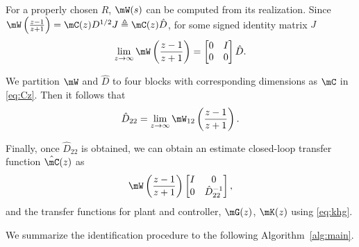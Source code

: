   For a properly chosen $R$, $\mW(s)$ can be computed from its realization. Since $\mW\left(\frac{z-1}{z+1}\right)=\mC(z)D^{1/2}J\triangleq \mC(z)\hat{D}$, for some signed identity matrix $J$ \cite{hayden}
  \begin{equation}
    \lim_{z\rightarrow\infty}\mW\left(\frac{z-1}{z+1}\right)=\begin{bmatrix} 0 & I \\
      0 & 0 
    \end{bmatrix} \hat{D}.
  \end{equation}

  We partition $\mW$ and $\hat{D}$ to four blocks with corresponding dimensions as $\mC$ in \eqref{eq:Cz}. Then it follows that 
  \begin{equation}\label{eq:D22}
    \hat{D}_{22}=\lim_{z\rightarrow\infty}\mW_{12}\left(\frac{z-1}{z+1}\right).
  \end{equation}

  Finally, once $\hat{D}_{22}$ is obtained, we can obtain an estimate closed-loop transfer function  $\hat{\mC}(z)$ as
  \begin{equation}
  \label{eq:estC}
    \mW\left(\frac{z-1}{z+1}\right)\begin{bmatrix} 
    I & 0 \\ 
    0 & \hat{D}^{-1}_{22}
    \end{bmatrix},
  \end{equation}
  and the transfer functions for plant and controller, $\mG(z)$, $\mK(z)$ using \eqref{eq:khg}.

  We summarize the identification procedure to the following Algorithm~\ref{alg:main}. 

